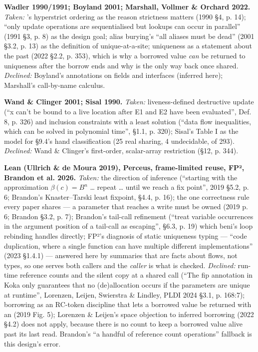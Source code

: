 \textbf{Wadler 1990/1991; Boyland 2001; Marshall, Vollmer \& Orchard 2022.} \emph{Taken:} 's hyperstrict ordering as the reason strictness matters (1990 §4, p. 14); “only update operations are sequentialised but lookups can occur in parallel” (1991 §3, p. 8) as the design goal; alias burying's “all aliases must be dead” (2001 §3.2, p. 13) as the definition of unique-at-a-site; uniqueness as a statement about the past (2022 §2.2, p. 353), which is why a borrowed value \emph{can} be returned to uniqueness after the borrow ends and why  is the only way back once shared. \emph{Declined:} Boyland's annotations on fields and interfaces (inferred here); Marshall's call-by-name calculus.

\textbf{Wand \& Clinger 2001; Sisal 1990.} \emph{Taken:} liveness-defined destructive update (“x can't be bound to a live location after E1 and E2 have been evaluated”, Def. 8, p. 326) and inclusion constraints with a least solution (“data flow inequalities, which can be solved in polynomial time”, §1.1, p. 320); Sisal's Table I as the model for §9.4's hand classification (25 real sharing, 4 undecidable, of 293). \emph{Declined:} Wand \& Clinger's first-order, scalar-array restriction (§12, p. 344).

\textbf{Lean (Ullrich \& de Moura 2019), Perceus, frame-limited reuse, FP², Brandon et al. 2026.} \emph{Taken:} the direction of inference (“starting with the approximation $\beta(c) = B^n$ … repeat … until we reach a fix point”, 2019 §5.2, p. 6; Brandon's Knaster–Tarski least fixpoint, §4.4, p. 16); the one correctness rule every paper shares — a parameter that reaches a write must be owned (2019 p. 6; Brandon §3.2, p. 7); Brandon's tail-call refinement (“treat variable occurrences in the argument position of a tail-call as escaping”, §6.3, p. 19) which beni's loop rebinding handles directly; FP²'s diagnosis of static uniqueness typing — “code duplication, where a single function can have multiple different implementations” (2023 §1.4.1) — answered here by summaries that are facts about flows, not types, so one  serves both callers and the \emph{caller} is what is checked. \emph{Declined:} run-time reference counts and the silent copy at a shared call (“The fip annotation in Koka only guarantees that no (de)allocation occurs if the parameters are unique at runtime”, Lorenzen, Leijen, Swierstra \& Lindley, PLDI 2024 §3.1, p. 168:7); borrowing as an RC-token discipline that lets a borrowed value be returned with an  (2019 Fig. 5); Lorenzen \& Leijen's space objection to inferred borrowing (2022 §4.2) does not apply, because there is no count to keep a borrowed value alive past its last read. Brandon's “a handful of reference count operations” fallback is this design's error.

